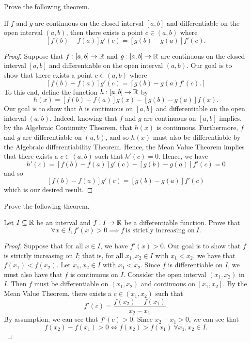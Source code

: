 \documentclass[a4paper]{article}
\begin{document}
\begin{problem}
    Prove the following theorem.
\end{problem}
\begin{theorem}
    If \( f \) and \( g  \) are continuous on the closed interval \( [a,b] \) and differentiable on the open interval \( (a,b) \), then there exists a point \( c \in (a,b) \) where 
    \[ [f(b) - f(a)]g'(c) = [g(b)- g(a)]f'(c). \]
\end{theorem}
\begin{proof}
    Suppose that \( f: [a,b] \to \mathbb{R}   \) and \( g: [a,b] \to \mathbb{R}   \) are continuous on the closed interval \( [a,b] \) and differentiable on the open interval \( (a,b) \). Our goal is to show that there exists a point \( c \in (a,b) \) where 
    \[  [f(b) - f(a)]g'(c) = [g(b) - g(a) f'(c).] \]
    To this end, define the function \( h : [a,b] \to \mathbb{R}  \) by \[ h(x) = [f(b)-f(a)]g(x) - [g(b)-g(a)]f(x) .\] Our goal is to show that \( h  \) is continuous on \( [a,b] \) and differentiable on the open interval \( (a,b) \). Indeed, knowing that \( f  \) and \( g  \) are continuous on \( [a,b] \) implies, by the Algebraic Continuity Theorem, that \( h(x) \) is continuous. Furthermore, \( f  \) and \( g  \) are differentiable on \( (a,b) \), and so \( h(x) \) must also be differentiable by the Algebraic differentiability Theorem. Hence, the Mean Value Theorem implies that there exists a \( c \in (a,b)  \) such that \( h'(c) =  0 \). Hence, we have 
    \[ h'(c) = [f(b) - f(a)]g'(c) - [g(b) - g(a)]f'(c) = 0   \]
    and so 
    \[  [f(b) - f(a)]g'(c) = [g(b) - g(a)]f'(c) \]
    which is our desired result.
\end{proof}

\begin{problem}
    Prove the following theorem.
\end{problem}
\begin{theorem}[ ]
   Let \( I \subseteq  \mathbb{R}   \) be an interval and \( f: I \to \mathbb{R}  \) be a differentiable function. Prove that 
   \[  \forall x \in I, f'(x) > 0 \implies f \ \text{is strictly increasing on} \ I.  \]
\end{theorem}
\begin{proof}
    Suppose that for all \( x \in I  \), we have \( f'(x) > 0  \). Our goal is to show that \( f  \) is strictly increasing on \( I  \); that is, for all \( {x}_{1}, {x}_{2} \in I \) with \( {x}_{1} < {x}_{2} \), we have that \( f({x}_{1}) < f({x}_{2}) \). Let \( {x}_{1}, {x}_{2} \in I  \) with \( {x}_{1} < {x}_{2} \). Since \( f  \) is differentiable on \( I  \), we must also have that \( f  \) is continuous on \( I  \). Consider the open interval \( ({x}_{1}, {x}_{2}) \) in \( I  \). Then \( f  \) must be differentiable on \( ({x}_{1}, {x}_{2}) \) and continuous on \( [{x}_{1}, {x}_{2}] \). By the Mean Value Theorem, there exists a \( c \in ({x}_{1}, {x}_{2}) \) such that 
    \[  f'(c) = \frac{ f({x}_{2}) - f({x}_{1}) }{ {x}_{2} - {x}_{1} }. \]
    By assumption, we can see that \( f'(c) > 0  \). Since \( {x}_{2} - {x}_{1} > 0  \), we can see that
    \[  f({x}_{2}) - f({x}_{1}) > 0 \iff f({x}_{2}) > f({x}_{1}) \ \forall {x}_{1}, {x}_{2} \in I.  \]
    
\end{proof}
\end{document}
